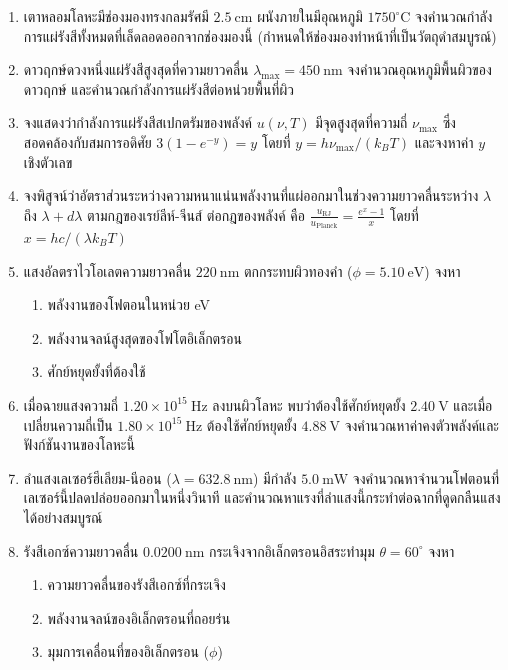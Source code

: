 \begin{enumerate}
    \item เตาหลอมโลหะมีช่องมองทรงกลมรัศมี $2.5~\text{cm}$ ผนังภายในมีอุณหภูมิ $1750^\circ\text{C}$ จงคำนวณกำลังการแผ่รังสีทั้งหมดที่เล็ดลอดออกจากช่องมองนี้ (กำหนดให้ช่องมองทำหน้าที่เป็นวัตถุดำสมบูรณ์)
    \item ดาวฤกษ์ดวงหนึ่งแผ่รังสีสูงสุดที่ความยาวคลื่น $\lambda_{\max} = 450~\text{nm}$ จงคำนวณอุณหภูมิพื้นผิวของดาวฤกษ์ และคำนวณกำลังการแผ่รังสีต่อหน่วยพื้นที่ผิว
    \item จงแสดงว่ากำลังการแผ่รังสีสเปกตรัมของพลังค์ $u(\nu, T)$ มีจุดสูงสุดที่ความถี่ $\nu_{\max}$ ซึ่งสอดคล้องกับสมการอดิศัย $3(1 - e^{-y}) = y$ โดยที่ $y = h\nu_{\max}/(k_B T)$ และจงหาค่า $y$ เชิงตัวเลข
    \item จงพิสูจน์ว่าอัตราส่วนระหว่างความหนาแน่นพลังงานที่แผ่ออกมาในช่วงความยาวคลื่นระหว่าง $\lambda$ ถึง $\lambda + d\lambda$ ตามกฎของเรย์ลีห์-จีนส์ ต่อกฎของพลังค์ คือ $\frac{u_{\text{RJ}}}{u_{\text{Planck}}} = \frac{e^x - 1}{x}$ โดยที่ $x = hc/(\lambda k_B T)$
    \item แสงอัลตราไวโอเลตความยาวคลื่น $220~\text{nm}$ ตกกระทบผิวทองคำ ($\phi = 5.10~\text{eV}$) จงหา
    \begin{enumerate}
        \item พลังงานของโฟตอนในหน่วย eV
        \item พลังงานจลน์สูงสุดของโฟโตอิเล็กตรอน
        \item ศักย์หยุดยั้งที่ต้องใช้
    \end{enumerate}
    \item เมื่อฉายแสงความถี่ $1.20 \times 10^{15}~\text{Hz}$ ลงบนผิวโลหะ พบว่าต้องใช้ศักย์หยุดยั้ง $2.40~\text{V}$ และเมื่อเปลี่ยนความถี่เป็น $1.80 \times 10^{15}~\text{Hz}$ ต้องใช้ศักย์หยุดยั้ง $4.88~\text{V}$ จงคำนวณหาค่าคงตัวพลังค์และฟังก์ชันงานของโลหะนี้
    \item ลำแสงเลเซอร์ฮีเลียม-นีออน ($\lambda = 632.8~\text{nm}$) มีกำลัง $5.0~\text{mW}$ จงคำนวณหาจำนวนโฟตอนที่เลเซอร์นี้ปลดปล่อยออกมาในหนึ่งวินาที และคำนวณหาแรงที่ลำแสงนี้กระทำต่อฉากที่ดูดกลืนแสงได้อย่างสมบูรณ์
    \item รังสีเอกซ์ความยาวคลื่น $0.0200~\text{nm}$ กระเจิงจากอิเล็กตรอนอิสระทำมุม $\theta = 60^\circ$ จงหา
    \begin{enumerate}
        \item ความยาวคลื่นของรังสีเอกซ์ที่กระเจิง
        \item พลังงานจลน์ของอิเล็กตรอนที่ถอยร่น
        \item มุมการเคลื่อนที่ของอิเล็กตรอน ($\phi$)
    \end{enumerate}

\end{enumerate}
